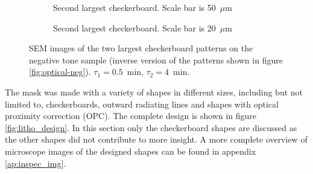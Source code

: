 \begin{figure}[!t]
\begin{subfigure}[t]{0.24\linewidth}
    	\centering
    	\caption{Second largest checkerboard. Scale bar is 50~$\mu$m}
    	\label{fig:b2d28_q28}
    \end{subfigure}
    \hfill
    \begin{subfigure}[t]{0.24\linewidth}
    	\centering
    	\caption{Second largest checkerboard. Scale bar is 20~$\mu$m}
    	\label{fig:b2d29_q29}
    \end{subfigure}
    \caption{SEM images of the two largest checkerboard patterns on the negative tone sample (inverse version of the patterns shown in figure \ref{fig:optical-neg}). $\tau_1 = 0.5$~min, $\tau_2 = 4$~min.}
    \label{fig:negative-sem}
\end{figure}
The mask was made with a variety of shapes in different sizes, including but not limited to, checkerboards, outward radiating lines and shapes with optical proximity correction (OPC). The complete design is shown in figure \ref{fig:litho_design}. In this section only the checkerboard shapes are discussed as the other shapes did not contribute to more insight. A more complete overview of microscope images of the designed shapes can be found in appendix \ref{ap:inspec_img}.

